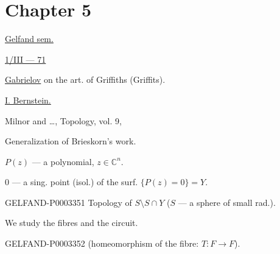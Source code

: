 \section*{Chapter 5}

\uline{Gelfand sem.}

\uline{1/III --- 71 }

\uline{Gabrielov} on the art. of Griffiths (Griffits).



\uline{I. Bernstein.}

Milnor and \ldots, Topology, vol. 9, 

Generalization of Brieskorn’s work.

$P (z)$ --- a polynomial, $z\in\mathbb C^n$.

$0$ --- a sing. point (isol.) of the surf. $\{P (z)=0\}=Y$.

\begin{GelfandAdjacentEvidence}{GELFAND-P000335}{1}
Topology of $S\setminus S\cap Y$ ($S$ --- a sphere of small rad.).





\end{GelfandAdjacentEvidence}


We study the fibres and the circuit.

\begin{GelfandAdjacentEvidence}{GELFAND-P000335}{2}
(homeomorphism of the fibre: $T: F\longrightarrow F$).





\end{GelfandAdjacentEvidence}



